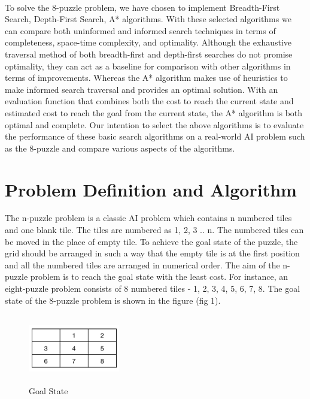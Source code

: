 \documentclass{svproc}
\begin{document}
\paragraph{}
To solve the 8-puzzle problem, we have chosen to implement Breadth-First Search, Depth-First Search, A* algorithms. With these selected algorithms we can compare both uninformed and informed search techniques in terms of completeness, space-time complexity, and optimality. Although the exhaustive traversal method of both breadth-first and depth-first searches do not promise optimality, they can act as a baseline for comparison with other algorithms in terms of improvements. Whereas the A* algorithm makes use of heuristics to make informed search traversal and provides an optimal solution. With an evaluation function that combines both the cost to reach the current state and estimated cost to reach the goal from the current state, the A* algorithm is both optimal and complete. Our intention to select the above algorithms is to evaluate the performance of these basic search algorithms on a real-world AI problem such as the 8-puzzle and compare various aspects of the algorithms.

\section{Problem Definition and Algorithm}
The n-puzzle problem is a classic AI problem which contains n numbered tiles and one blank tile. The tiles are numbered as 1, 2, 3 .. n. The numbered tiles can be moved in the place of empty tile. To achieve the goal state of the puzzle, the grid should be arranged in such a way that the empty tile is at the first position and all the numbered tiles are arranged in numerical order. The aim of the n-puzzle problem is to reach the goal state with the least cost. For instance, an eight-puzzle problem consists of 8 numbered tiles - 1, 2, 3, 4, 5, 6, 7, 8. The goal state of the 8-puzzle problem is shown in the figure (fig 1).

\begin{figure}
	\centering
	\includegraphics[width=4cm,height=3cm,keepaspectratio]{GoalState.png}
	\caption{Goal State}
	\label{fig:1}
\end{figure}
\end{document}

